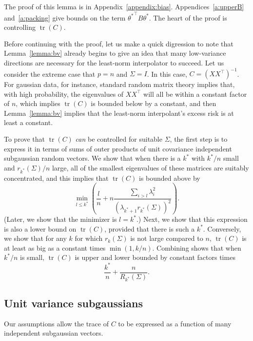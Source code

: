 \documentclass[11pt,notitlepage]{article}
\newcommand\tr {\ensuremath{\operatorname{\mathrm{tr}}}}
\begin{document}
The proof of this lemma is in Appendix~\ref{appendix:bias}.
Appendices~\ref{a:upperB} and~\ref{a:packing} give bounds on the term
${\theta^\ast}^\top B \theta^\ast$.
The heart of the proof is controlling $\tr(C)$.

Before continuing with the proof, let us make a quick digression to
note that Lemma~\ref{lemma:bv} already begins to give an idea that
many low-variance directions are necessary for the least-norm
interpolator to succeed.  Let us consider the extreme case that $p =
n$ and $\Sigma = I$.  In this case, $C = \left(X X^\top \right)^{-1}$.
For gaussian data, for instance, standard random matrix theory implies
that, with high probability, the eigenvalues of $X X^\top$ will
all be within a constant factor of $n$,
which implies $\tr(C)$ is bounded below by a constant,
and then Lemma~\ref{lemma:bv} implies that the least-norm interpolant's
excess risk is at least a constant.

To prove that
$\tr(C)$ {\em can}\/ be controlled for suitable
$\Sigma$, the first step is to express it in terms of
sums of outer products of unit covariance independent subgaussian
random vectors.
We show that when there is a $k^*$ with $k^*/n$ small and
$r_{k^*}(\Sigma)/n$ large, all of the
smallest eigenvalues of these matrices are suitably concentrated,
and this implies that $\tr(C)$ is bounded above by
  \[
    \min_{l\le k^*}\left(\frac{l}{n} + 
       n\frac{\sum_{i>l}\lambda_i^2}
      {\left(\lambda_{k^*+1}r_{k^*}(\Sigma)\right)^2}\right).
  \]
(Later, we show that the minimizer is $l=k^*$.)
Next, we show that this expression is also a lower bound on $\tr(C)$,
provided that there is such a $k^*$.
Conversely, we show that for any
$k$ for which $r_k(\Sigma)$ is not large compared to $n$,
$\tr(C)$ is at least as big as a constant times $\min(1,k/n)$.
Combining shows that when $k^*/n$ is small,
$\tr(C)$ is upper and lower bounded by constant factors times
  \[
    \frac{k^*}{n} + \frac{n}{R_{k^*}(\Sigma)}.
  \]

\subsection*{Unit variance subgaussians}

Our assumptions allow the trace of $C$ to be expressed
as a function of many independent subgaussian vectors.
\end{document}
